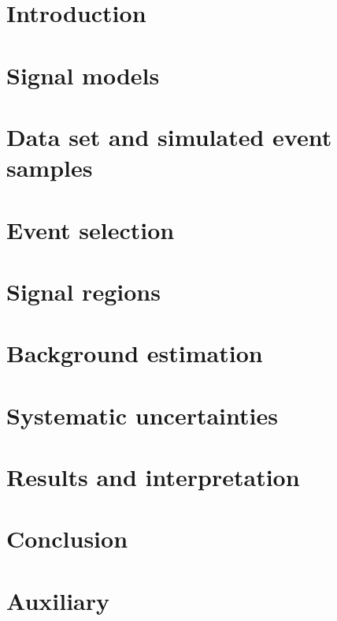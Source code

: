 \section{Introduction}
\label{sec:intro}


\section{Signal models}
\label{sec:signals}
\graphicspath{{figures/signals/}}


\section{Data set and simulated event samples}
\label{sec:dataMC}
\graphicspath{{figures/dataMC/}}


\section{Event selection}
\label{sec:selection}
\graphicspath{{figures/sel/}}


\section{Signal regions}
\label{sec:sr}
\graphicspath{{figures/sr/}}


\section{Background estimation}
\label{sec:bkg}
\graphicspath{{figures/bkg/}}


\section{Systematic uncertainties}
\label{sec:syst}
\graphicspath{{figures/syst/}}


\section{Results and interpretation}
\label{sec:res}
\graphicspath{{figures/res/}}


\section{Conclusion}
\label{sec:concl}


\section{Auxiliary}
\label{sec:aux}
\graphicspath{{figures/aux/}}

